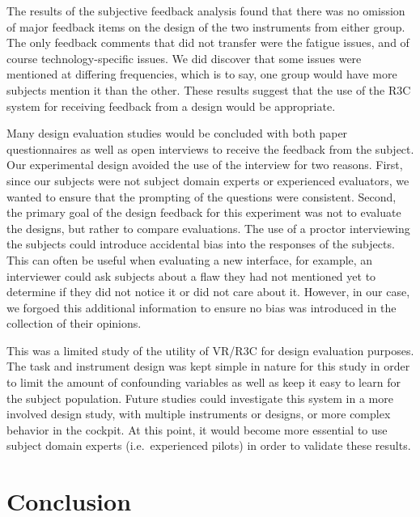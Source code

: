 The results of the subjective feedback analysis found that there was no omission of major feedback items on the design of the two instruments from either group.
The only feedback comments that did not transfer were the fatigue issues, and of course technology-specific issues.
We did discover that some issues were mentioned at differing frequencies, which is to say, one group would have more subjects mention it than the other.
These results suggest that the use of the R3C system for receiving feedback from a design would be appropriate.

Many design evaluation studies would be concluded with both paper questionnaires as well as open interviews to receive the feedback from the subject.
Our experimental design avoided the use of the interview for two reasons.
First, since our subjects were not subject domain experts or experienced evaluators, we wanted to ensure that the prompting of the questions were consistent.
Second, the primary goal of the design feedback for this experiment was not to evaluate the designs, but rather to compare evaluations.
The use of a proctor interviewing the subjects could introduce accidental bias into the responses of the subjects.
This can often be useful when evaluating a new interface, for example, an interviewer could ask subjects about a flaw they had not mentioned yet to determine if they did not notice it or did not care about it.
However, in our case, we forgoed this additional information to ensure no bias was introduced in the collection of their opinions.


This was a limited study of the utility of VR/R3C for design evaluation purposes.
The task and instrument design was kept simple in nature for this study in order to limit the amount of confounding variables as well as keep it easy to learn for the subject population.
Future studies could investigate this system in a more involved design study, with multiple instruments or designs, or more complex behavior in the cockpit.
At this point, it would become more essential to use subject domain experts (i.e.\ experienced pilots) in order to validate these results.

\section{Conclusion}
